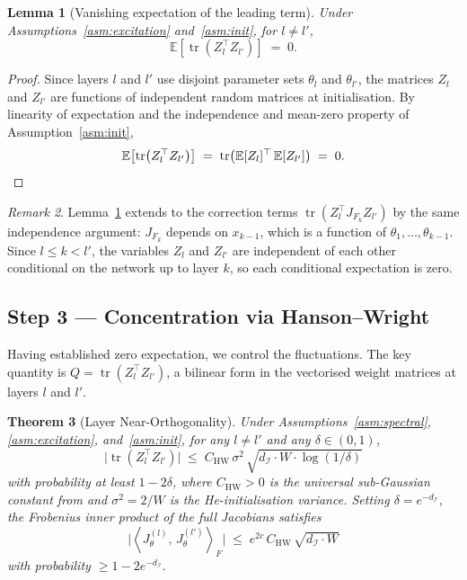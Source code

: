 \documentclass[11pt]{article}
\theoremstyle{plain}
\newtheorem{theorem}{Theorem}[section]
\newtheorem{lemma}[theorem]{Lemma}
\theoremstyle{definition}
\theoremstyle{remark}
\newtheorem{remark}[theorem]{Remark}
\newcommand{\E}{\mathbb{E}}
\newcommand{\inner}[2]{\left\langle #1,\, #2 \right\rangle}
\newcommand{\tr}{\operatorname{tr}}
\newcommand{\dI}{d_{\mathcal{I}}}
\begin{document}
\begin{lemma}[Vanishing expectation of the leading term]
\label{lem:zero-mean}
Under Assumptions~\ref{asm:excitation} and~\ref{asm:init}, for $l\neq l'$,
\[
  \E\!\left[\tr\!\left(Z_l^\top Z_{l'}\right)\right] \;=\; 0.
\]
\end{lemma}

\begin{proof}
Since layers $l$ and $l'$ use disjoint parameter sets $\theta_l$ and
$\theta_{l'}$, the matrices $Z_l$ and $Z_{l'}$ are functions of independent
random matrices at initialisation.  By linearity of expectation and the
independence and mean-zero property of Assumption~\ref{asm:init},
\[
  \E\!\left[\tr\!\left(Z_l^\top Z_{l'}\right)\right]
  \;=\;
  \tr\!\left(\E[Z_l]^\top\,\E[Z_{l'}]\right)
  \;=\; 0.
  \qedhere
\]
\end{proof}

\begin{remark}
Lemma~\ref{lem:zero-mean} extends to the correction terms
$\tr(Z_l^\top J_{F_k} Z_{l'})$ by the same independence argument:
$J_{F_k}$ depends on $x_{k-1}$, which is a function of
$\theta_1,\ldots,\theta_{k-1}$.  Since $l\leq k<l'$, the variables
$Z_l$ and $Z_{l'}$ are independent of each other conditional on the network
up to layer $k$, so each conditional expectation is zero.
\end{remark}

\subsection{Step 3 --- Concentration via Hanson--Wright}

Having established zero expectation, we control the fluctuations.  The key
quantity is $Q=\tr(Z_l^\top Z_{l'})$, a bilinear form in the vectorised
weight matrices at layers $l$ and $l'$.

\begin{theorem}[Layer Near-Orthogonality]
\label{thm:main}
Under Assumptions~\ref{asm:spectral}, \ref{asm:excitation},
and~\ref{asm:init}, for any $l\neq l'$ and any $\delta\in(0,1)$,
\[
  \bigl|\tr\!\left(Z_l^\top Z_{l'}\right)\bigr|
  \;\leq\;
  C_{\mathrm{HW}}\,\sigma^2\,\sqrt{\dI\cdot W\cdot\log(1/\delta)}
\]
with probability at least $1-2\delta$, where $C_{\mathrm{HW}}>0$ is the
universal sub-Gaussian constant from \citet{rudelson2013} and
$\sigma^2=2/W$ is the He-initialisation variance.
Setting $\delta=e^{-\dI}$, the Frobenius inner product of the full Jacobians
satisfies
\begin{equation}
\label{eq:cross}
  \bigl|\inner{J_\theta^{(l)}}{J_\theta^{(l')}}_F\bigr|
  \;\leq\;
  e^{2c}\,C_{\mathrm{HW}}\,\sqrt{\dI\cdot W}
\end{equation}
with probability $\geq 1-2e^{-\dI}$.
\end{theorem}
\end{document}
